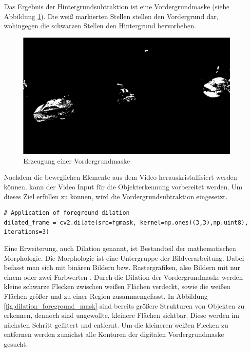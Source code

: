 Das Ergebnis der Hintergrundsubtraktion ist eine Vordergrundmaske (siehe Abbildung \ref{fig:vordergrundmaske}). Die weiß markierten Stellen stellen den Vordergrund dar, wohingegen die schwarzen Stellen den Hintergrund hervorheben. 

\begin{figure}[htb]
	\centering
	\includegraphics[width=.9\textwidth]{images/abbildung_fgmask}
	\caption{Erzeugung einer Vordergrundmaske}
	\label{fig:vordergrundmaske}
\end{figure}

\newpage

Nachdem die beweglichen Elemente aus dem Video herauskristallisiert werden können, kann der Video Input für die Objekterkennung vorbereitet werden. Um dieses Ziel erfüllen zu können, wird die Vordergrundsubtraktion eingesetzt. 

\vspace*{10mm}
\begin{lstlisting}[caption={Dilation der Vordergrundmaske}, label={lst:foreground_dilation}]
# Application of foreground dilation
dilated_frame = cv2.dilate(src=fgmask, kernel=np.ones((3,3),np.uint8), iterations=3)
\end{lstlisting}

Eine Erweiterung, auch Dilation genannt, ist Bestandteil der mathematischen Morphologie. Die Morphologie ist eine Untergruppe der Bildverarbeitung. Dabei befasst man sich mit binären Bildern bzw. Rastergrafiken, also Bildern mit nur einem oder zwei Farbwerten \cite{Soille1998}. %
Durch die Dilation der Vordergrundmaske werden kleine schwarze Flecken zwischen weißen Flächen verdeckt, sowie die weißen Flächen größer und zu einer Region zusammengefasst. In Abbildung \ref{fig:dilation_foreground_mask} sind bereits größere Strukturen von Objekten zu erkennen, dennoch sind ungewollte, kleinere Flächen sichtbar. Diese werden im nächsten Schritt gefiltert und entfernt. Um die kleineren weißen Flecken zu entfernen werden zunächst alle Konturen der digitalen Vordergrundmaske gesucht. 

